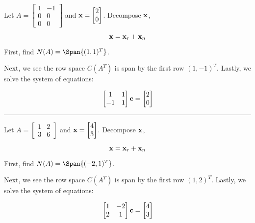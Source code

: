 \begin{example}
Let $A = \begin{bmatrix} 1 & -1 \\ 0 & 0\\ 0 & 0 \end{bmatrix}$ and ${\bf x} = \begin{bmatrix}  2 \\ 0 \end{bmatrix}$.  Decompose ${\bf x}$, 

\[  {\bf x}  = {\bf x}_r + {\bf x}_n  \]

First, find $N(A) = \Span\{(1,1)^T\}$. 

Next, we see the row space $C(A^T)$ is span by the first row $(1, -1)^T$.  Lastly, we solve the system of equations:

\[  \begin{bmatrix} 1 & 1 \\ -1 & 1 \end{bmatrix} {\bf c} = \begin{bmatrix}  2 \\ 0 \end{bmatrix} \]


\end{example}










\rule[0.01in]{\textwidth}{0.0025in}







\begin{example}
Let $A = \begin{bmatrix} 1 & 2 \\ 3 & 6 \end{bmatrix}$ and ${\bf x} = \begin{bmatrix}  4 \\ 3 \end{bmatrix}$.  Decompose ${\bf x}$, 

\[  {\bf x}  = {\bf x}_r + {\bf x}_n  \]

First, find $N(A) = \Span\{(-2,1)^T\}$. 

Next, we see the row space $C(A^T)$ is span by the first row $(1, 2)^T$.  Lastly, we solve the system of equations:

\[  \begin{bmatrix} 1 & -2 \\ 2 & 1 \end{bmatrix} {\bf c} = \begin{bmatrix}  4 \\ 3 \end{bmatrix} \]


\end{example}






